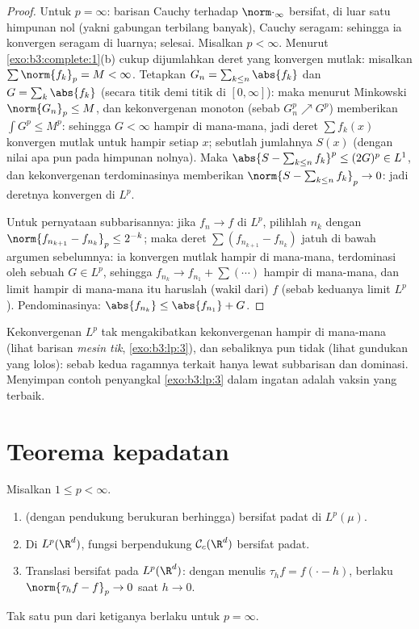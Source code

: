 \begin{proof}
Untuk $p = \infty$: barisan Cauchy terhadap $\norm\cdot_\infty$ bersifat, di luar
satu himpunan nol (yakni gabungan terbilang banyak), Cauchy seragam:
sehingga ia konvergen seragam di luarnya; selesai. Misalkan $p < \infty$. Menurut
\cref{exo:b3:complete:1}(b) cukup dijumlahkan deret yang konvergen
mutlak: misalkan $\sum\norm{f_k}_p = M < \infty$. Tetapkan
$G_n = \sum_{k \leq n}\abs{f_k}$ dan $G = \sum_k\abs{f_k}$
(secara titik demi titik di $[0,\infty]$): maka menurut Minkowski $\norm{G_n}_p \leq
M$, dan kekonvergenan monoton (sebab $G_n^p \nearrow G^p$) memberikan $\int G^p \leq M^p$:
sehingga $G < \infty$ hampir di mana-mana, jadi deret $\sum f_k(x)$ konvergen
mutlak untuk hampir setiap $x$; sebutlah jumlahnya $S(x)$ (dengan nilai apa pun pada
himpunan nolnya). Maka $\abs{S - \sum_{k\leq n}f_k}^p \leq (2G)^p
\in L^1$, dan kekonvergenan terdominasinya memberikan $\norm{S - \sum_{k\leq n}f_k}_p \to 0$:
jadi deretnya konvergen di $L^p$.

Untuk pernyataan subbarisannya: jika $f_n \to f$ di $L^p$, pilihlah $n_k$
dengan $\norm{f_{n_{k+1}} - f_{n_k}}_p \leq 2^{-k}$; maka deret
$\sum(f_{n_{k+1}} - f_{n_k})$ jatuh di bawah argumen
sebelumnya: ia konvergen mutlak hampir di mana-mana, terdominasi oleh sebuah $G \in
L^p$, sehingga $f_{n_k} \to f_{n_1} + \sum(\cdots)$ hampir di mana-mana, dan limit
hampir di mana-mana itu haruslah (wakil dari) $f$ (sebab keduanya limit
$L^p$). Pendominasinya: $\abs{f_{n_k}} \leq \abs{f_{n_1}} + G$.
\end{proof}

\begin{remark}\label{rem:b3:lp:modes}
Kekonvergenan $L^p$ tak mengakibatkan kekonvergenan hampir di mana-mana (lihat
barisan \emph{mesin tik}, \cref{exo:b3:lp:3}), dan sebaliknya pun tidak
(lihat gundukan yang lolos): sebab kedua ragamnya terkait hanya
lewat subbarisan dan dominasi. Menyimpan contoh penyangkal
\cref{exo:b3:lp:3} dalam ingatan adalah vaksin yang terbaik.
\end{remark}

\section{Teorema kepadatan}

\begin{theorem}\label{thm:b3:lp:density}
Misalkan $1 \leq p < \infty$.
\begin{enumerate}
  \item {} (dengan pendukung berukuran berhingga) bersifat
        padat di $L^p(\mu)$.
  \item Di $L^p(\R^d)$, fungsi  berpendukung 
        $\mathcal C_c(\R^d)$ bersifat padat.
  \item Translasi bersifat  pada $L^p(\R^d)$: dengan menulis
        $\tau_hf = f(\cdot - h)$, berlaku $\norm{\tau_hf - f}_p \to 0$
        saat $h \to 0$.
\end{enumerate}
Tak satu pun dari ketiganya berlaku untuk $p = \infty$.
\end{theorem}

